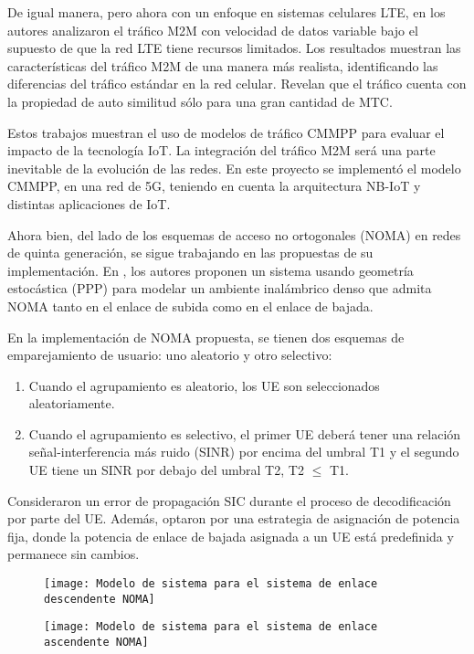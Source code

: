 De igual manera, pero ahora con un enfoque en sistemas celulares LTE, en \parencite{Smiljkovic2014} los autores analizaron el tráfico M2M con velocidad de datos variable bajo el supuesto de que la red LTE tiene recursos limitados. Los resultados muestran las características del tráfico M2M de una manera más realista, identificando las diferencias del tráfico estándar en la red celular. Revelan que el tráfico cuenta con la propiedad de auto similitud sólo para una gran cantidad de MTC.\newline

Estos trabajos muestran el uso de modelos de tráfico CMMPP para evaluar el impacto de la tecnología IoT. La integración del tráfico M2M será una parte inevitable de la evolución de las redes. En este proyecto se implementó el modelo CMMPP, en una red de 5G, teniendo en cuenta la arquitectura NB-IoT y distintas aplicaciones de IoT.\newline

Ahora bien, del lado de los esquemas de acceso no ortogonales (NOMA) en redes de quinta generación, se sigue trabajando en las propuestas de su implementación. En \parencite{Zhang2017}, los autores proponen un sistema usando geometría estocástica (PPP) para modelar un ambiente inalámbrico denso que admita NOMA tanto en el enlace de subida como en el enlace de bajada. \newline

En la implementación de NOMA propuesta, se tienen dos esquemas de emparejamiento de usuario: uno aleatorio y otro selectivo:
\begin{enumerate}
\item  Cuando el agrupamiento es aleatorio, los UE son seleccionados aleatoriamente.
\item  Cuando el agrupamiento es selectivo, el primer UE deberá tener una relación señal-interferencia más ruido (SINR) por encima del umbral T1 y el segundo UE tiene un SINR por debajo del umbral T2, T2 $\mathrm{\le}$ T1.
\end{enumerate}

Consideraron un error de propagación SIC durante el proceso de decodificación por parte del UE. Además, optaron por una estrategia de asignación de potencia fija, donde la potencia de enlace de bajada asignada a un UE está predefinida y permanece sin cambios.\newline

\begin{figure}
\centering
\begin{minipage}{.45\linewidth}
  \texttt{[image: Modelo de sistema para el sistema de enlace descendente NOMA]}
  \label{fig:img1}
\end{minipage}
\hspace{.05\linewidth}
\begin{minipage}{.45\linewidth}
  \texttt{[image: Modelo de sistema para el sistema de enlace ascendente NOMA]}
  \label{fig:img2}
\end{minipage}
\end{figure}

